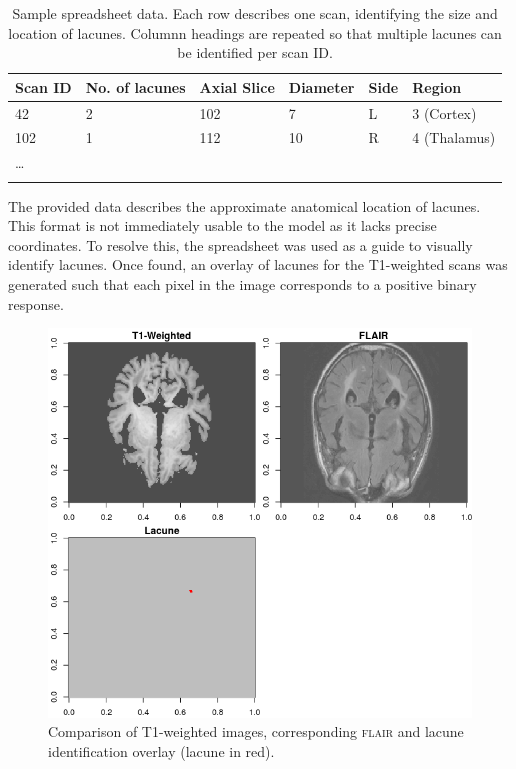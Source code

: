 \begin{table}[ht]
	\centering
	\begin{tabular}{llllll}
	\toprule[1.5pt]
	Scan ID & No. of lacunes & Axial Slice & Diameter & Side & Region\\
	\midrule
	42 & 2 & 102 & 7 & L & 3 (Cortex)\\
	102 & 1 & 112 & 10 & R & 4 (Thalamus)\\
	\ldots\\
	\bottomrule[1.5pt]\\
	\end{tabular}
	\caption{\small{Sample spreadsheet data. Each row describes one scan, identifying the size and location of lacunes. Columnn headings are repeated so that multiple lacunes can be identified per scan ID.}}
	\label{data-excel-tab}
\end{table}

The provided data describes the approximate anatomical location of lacunes. This format is not immediately usable to the model as it lacks precise coordinates. To resolve this, the spreadsheet was used as a guide to visually identify lacunes. Once found, an overlay of lacunes for the T1-weighted scans was generated such that each pixel in the image corresponds to a positive binary response.

\begin{figure}[ht]
\centering
\includegraphics[width=\linewidth]{Images/6_lacune_mask.png}
\caption{Comparison of T1-weighted images, corresponding \textsc{flair} and lacune identification overlay (lacune in red).}
\label{data-t1-flair-lac}
\end{figure}

